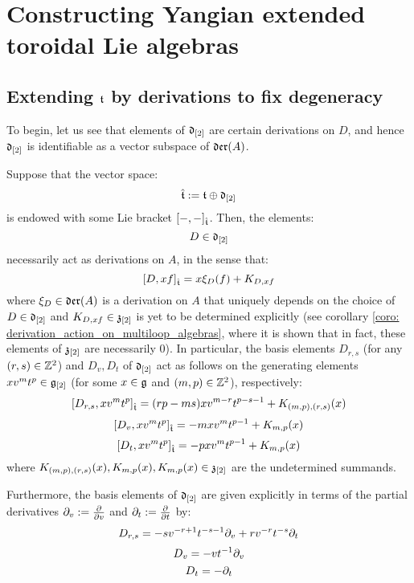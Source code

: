 \section{Constructing Yangian extended toroidal Lie algebras}
    \subsection{Extending \texorpdfstring{$\mathfrak{t}$}{} by derivations to fix degeneracy}
        To begin, let us see that elements of $\mathfrak{d}_{[2]}$ are certain derivations on $D$, and hence $\mathfrak{d}_{[2]}$ is identifiable as a vector subspace of $\mathfrak{der}(A)$.
        \begin{lemma} \label{lemma: derivation_action_on_multiloop_algebras}
            Suppose that the vector space:
                $$\hat{\mathfrak{t}} := \mathfrak{t} \oplus \mathfrak{d}_{[2]}$$
            is endowed with some Lie bracket $[-, -]_{\hat{\mathfrak{t}}}$. Then, the elements:
                $$D \in \mathfrak{d}_{[2]}$$
            necessarily act as derivations on $A$, in the sense that:
                $$[D, xf]_{\hat{\mathfrak{t}}} = x \xi_D(f) + K_{D, xf}$$
            where $\xi_D \in \mathfrak{der}(A)$ is a derivation on $A$ that uniquely depends on the choice of $D \in \mathfrak{d}_{[2]}$ and $K_{D, xf} \in \mathfrak{z}_{[2]}$ is yet to be determined explicitly (see corollary \ref{coro: derivation_action_on_multiloop_algebras}, where it is shown that in fact, these elements of $\mathfrak{z}_{[2]}$ are necessarily $0$). In particular, the basis elements $D_{r, s}$ (for any $(r, s) \in \mathbb{Z}^2$) and $D_v, D_t$ of $\mathfrak{d}_{[2]}$ act as follows on the generating elements $x v^m t^p \in \mathfrak{g}_{[2]}$ (for some $x \in \mathfrak{g}$ and $(m, p) \in \mathbb{Z}^2$), respectively:
                $$[D_{r, s}, x v^m t^p]_{\hat{\mathfrak{t}}} = ( rp - ms ) x v^{m - r} t^{p - s - 1} + K_{(m, p), (r, s)}(x)$$
                $$[D_v, x v^m t^p]_{\hat{\mathfrak{t}}} = -m x v^m t^{p - 1} + K_{m, p}(x)$$
                $$[D_t, x v^m t^p]_{\hat{\mathfrak{t}}} = -p x v^m t^{p - 1} + K_{m, p}(x)$$
            where $K_{(m, p), (r, s)}(x), K_{m, p}(x), K_{m, p}(x) \in \mathfrak{z}_{[2]}$ are the undetermined summands.

            Furthermore, the basis elements of $\mathfrak{d}_{[2]}$ are given explicitly in terms of the partial derivatives $\partial_v := \frac{\partial}{\partial v}$ and $\partial_t := \frac{\partial}{\partial t}$ by:
                $$D_{r, s} = -s v^{-r + 1} t^{-s - 1} \partial_v + r v^{-r} t^{-s} \partial_t$$
                $$D_v = -v t^{-1} \partial_v$$
                $$D_t = -\partial_t$$
        \end{lemma}
